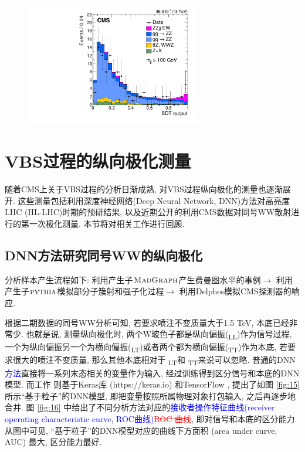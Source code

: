 \documentclass{SCIS2020cn}
\newcommand{\MADGRAPH}{\textsc{MadGraph}\xspace}
\newcommand{\PYTHIA}{{\textsc{pythia}}\xspace}
\newcommand{\Wboson}{\text{W}}
\newcommand{\add}{\textcolor{blue}}
\newcommand{\rmv}[1]{\textcolor{red}{\sout{#1}}}
\begin{document}
\begin{figure}[ht!]
\centering
\includegraphics[width=3in]{Figure-14.pdf}
\label{fig:14}
\end{figure}

\section{VBS过程的纵向极化测量}

随着CMS上关于VBS过程的分析日渐成熟, 对VBS过程纵向极化的测量也逐渐展开. 这些测量包括利用深度神经网络(Deep Neural Network, DNN)方法对高亮度LHC (HL-LHC)时期的预研结果, 以及近期公开的利用CMS数据对同号WW散射进行的第一次极化测量. 本节将对相关工作进行回顾. 

\subsection{DNN方法研究同号WW的纵向极化}

分析样本产生流程如下: 利用产生子$\MADGRAPH$产生费曼图水平的事例$\rightarrow$ 利用产生子$\PYTHIA$模拟部分子簇射和强子化过程$\rightarrow$ 利用Delphes模拟CMS探测器的响应. 

根据二期数据的同号WW分析可知, 若要求喷注不变质量大于1.5
TeV, 本底已经非常少. 也就是说, 测量纵向极化时, 两个W玻色子都是纵向偏振(\Wboson\textsubscript{L}\Wboson\textsubscript{L})作为信号过程, 一个为纵向偏振另一个为横向偏振(\Wboson\textsubscript{L}\Wboson\textsubscript{T})或者两个都为横向偏振(\Wboson\textsubscript{T}\Wboson\textsubscript{T})作为本底, 若要求很大的喷注不变质量, 那么其他本底相对于 \Wboson\textsubscript{L}\Wboson\textsubscript{T}和 \Wboson\textsubscript{T}\Wboson\textsubscript{T}来说可以忽略. 普通的DNN\add{方法}直接将一系列末态相关的变量作为输入, 经过训练得到区分信号和本底的DNN模型. 而工作 \cite{53} 则基于Keras库 (https://keras.io) 和TensorFlow , 提出了如图 \ref{fig:15} 所示``基于粒子''的DNN模型, 即把变量按照所属物理对象打包输入, 之后再逐步地合并. 图 \ref{fig:16} 中给出了不同分析方法对应的\add{接收者操作特征曲线(receiver operating characteristic curve, ROC曲线)}\rmv{ROC 曲线}, 即对信号和本底的区分能力. 从图中可见, ``基于粒子''的DNN模型对应的曲线下方面积 (area under curve, AUC) 最大, 区分能力最好. 
\end{document}
